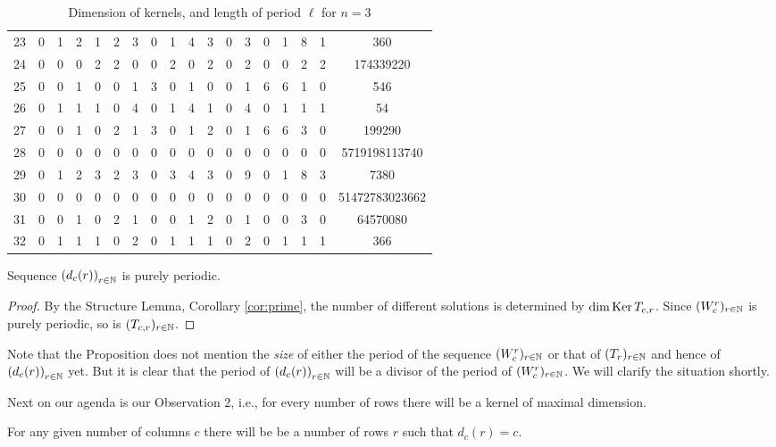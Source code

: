 \begin{table}
\begin{center}
\begin{adjustbox}{max width=\textwidth}
\begin{tabular}{|c|cccccccccccccccc|c|}
23 &0 &1 &2 &1 &2 &3 &0 &1 &4 &3 &0 &3 &0 &1 &8 &1 &360\\
24 &0 &0 &0 &2 &2 &0 &0 &2 &0 &2 &0 &2 &0 &0 &2 &2 &174339220\\
25 &0 &0 &1 &0 &0 &1 &3 &0 &1 &0 &0 &1 &6 &6 &1 &0 &546\\
26 &0 &1 &1 &1 &0 &4 &0 &1 &4 &1 &0 &4 &0 &1 &1 &1 &54\\
27 &0 &0 &1 &0 &2 &1 &3 &0 &1 &2 &0 &1 &6 &6 &3 &0 &199290\\
28 &0 &0 &0 &0 &0 &0 &0 &0 &0 &0 &0 &0 &0 &0 &0 &0 &5719198113740\\
29 &0 &1 &2 &3 &2 &3 &0 &3 &4 &3 &0 &9 &0 &1 &8 &3 &7380\\
30 &0 &0 &0 &0 &0 &0 &0 &0 &0 &0 &0 &0 &0 &0 &0 &0 &51472783023662\\
31 &0 &0 &1 &0 &2 &1 &0 &0 &1 &2 &0 &1 &0 &0 &3 &0 &64570080\\
32 &0 &1 &1 &1 &0 &2 &0 &1 &1 &1 &0 &2 &0 &1 &1 &1 &366\\
\hline
\end{tabular}
\end{adjustbox}
\end{center}
\caption{Dimension of kernels, and length of period $\ell$ for $n=3$}
\end{table}

\begin{proposition}[Observation 1]
Sequence $\left(d_{c}(r)\right)_{r\in\mathbb{N}}$ is purely periodic.
\end{proposition}

\begin{proof}
By the Structure Lemma, Corollary \ref{cor:prime},
the number of different solutions is determined by 
$\dim\operatorname{Ker} T_{c,r}$.
  Since $(W_{c}^{r})_{r\in\mathbb{N}}$ is purely periodic, so is
  $(T_{c,r})_{r\in\mathbb{N}}$.
\end{proof}
Note that the Proposition does not mention the {\it size} of either the period
of the sequence $(W_{c}^{r})_{r\in\mathbb{N}}$ or that of $(T_{r})_{r\in\mathbb{N}}$
and hence of $\left(d_{c}(r)\right)_{r\in\mathbb{N}}$ yet. But it is clear that
the period of $\left(d_{c}(r)\right)_{r\in\mathbb{N}}$
will be a divisor of the period of $(W_{c}^{r})_{r\in\mathbb{N}}$. 
We will clarify the situation shortly.

Next on our agenda is our Observation 2, i.e., for
every number of rows there will be a kernel of maximal dimension.

\begin{lemma}[Observation 2]\label{lem:max}
For any given number of columns $c$ there will be be a number of rows $r$
such that $d_c(r)=c$.
\end{lemma}


